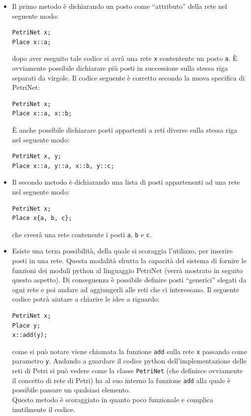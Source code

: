 \documentclass[italian,12pt]{book}
\begin{document}
\begin{itemize}

\item Il primo metodo è dichiarando un posto come ``attributo'' della rete nel seguente modo:
\begin{verbatim}PetriNet x;
Place x::a;
\end{verbatim}
dopo aver eseguito tale codice si avrà una rete {\tt x} contentente un posto {\tt a}.
È ovviamente possibile dichiarare più posti in successione sulla stessa riga separati da 
virgole. Il codice seguente è corretto secondo la nuova specifica di PetriNet:
\begin{verbatim}PetriNet x;
Place x::a, x::b;
\end{verbatim}
È anche possibile dichiarare posti appartenti a reti diverse sulla stessa riga nel seguente modo:
\begin{verbatim}PetriNet x, y;
Place x::a, y::a, x::b, y::c;
\end{verbatim}

\item Il secondo metodo è dichiarando una lista di posti appartenenti ad una rete nel seguente modo:
\begin{verbatim}PetriNet x;
Place x{a, b, c};
\end{verbatim}
che creerà una rete contenente i posti {\tt a}, {\tt b} e {\tt c}.

\item Esiste una terza possibilità, della quale si scoraggia l'utilizzo, per inserire posti in una rete.
Questa modalità sfrutta la capacità del sistema di fornire le funzioni dei moduli python al linguaggio PetriNet
(verrà mostrato in seguito questo aspetto). Di conseguenza è possibile definire posti ``generici'' slegati da 
ogni rete e poi andare ad aggiungerli alle reti che ci interessano. Il seguente codice potrà aiutare a chiarire
le idee a riguardo:
\begin{verbatim}PetriNet x;
Place y;
x::add(y);
\end{verbatim}
come si può notare viene chiamata la funzione {\tt add} sulla rete {\tt x} passando come parametro {\tt y}.
Andando a guardare il codice python dell'implementazione delle reti di Petri si può vedere come la classe 
{\tt PetriNet} (che definisce ovviamente il concetto di rete di Petri) ha al suo interno la funzione {\tt add}
alla quale è possibile passare un qualsiasi elemento.\\
Questo metodo è scoraggiato in quanto poco funzionale e complica inutilmente il codice.
\end{itemize}
\end{document}
